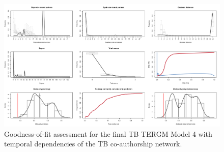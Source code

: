 \begin{figure}
\centering
\hspace*{-1cm}
\includegraphics[scale=0.5]{Chapters/tb/statMod/tb_tergm_gof}
\caption{Goodness-of-fit assessment for the final TB TERGM Model 4 with temporal dependencies of the TB co-authorship network.}
\label{fig:tb_tergm-gof}
\end{figure}

\pagebreak
